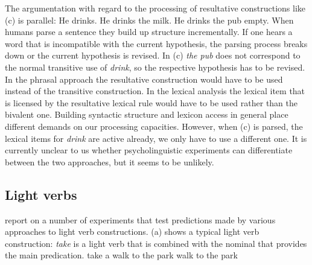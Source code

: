 \begin{exe}
\begin{xlist}[iv.]
\begin{exe}
\begin{xlist}[iv.]
The argumentation with regard to the processing of resultative constructions like (c) is parallel:
\eal
\ex He drinks.
\ex He drinks the milk.
\ex He drinks the pub empty.
\zl
When humans parse a sentence they build up structure incrementally. If one hears a word that is
incompatible with the current hypothesis, the parsing process breaks down or the current hypothesis
is revised. In (c) \emph{the pub} does not correspond to the normal transitive use of
\emph{drink}, so the respective hypothesis has to be revised. In the phrasal approach the resultative
construction would have to be used instead of the transitive construction. In the lexical analysis
the lexical item that is licensed by the resultative lexical rule would have to be used rather than
the bivalent one. Building syntactic structure and lexicon access in general place different
demands on our processing capacities. However, when (c) is parsed, the lexical items for
\emph{drink} are active already, we only have to use a different one. It is currently unclear to us
whether psycholinguistic experiments can differentiate between the two approaches, but it seems to
be unlikely.


\subsection{Light verbs}
\label{sec-psycho-lv}

\addlines[2]
\citet*{WJKP2014a} report on a number of experiments that test predictions made by
various approaches to light verb constructions. (a) shows a typical light verb construction:
\emph{take} is a light verb that is combined with the nominal that provides the main
predication. 
\eal
\ex take a walk to the park
\ex walk to the park
\zl


\end{xlist}
\end{exe}
\end{xlist}
\end{exe}
